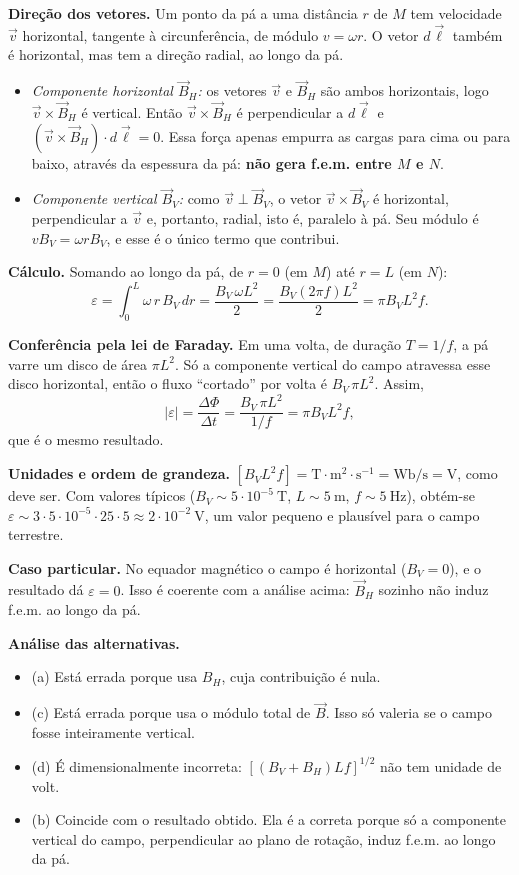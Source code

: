 \documentclass{article}%
\begin{document}
\textbf{Direção dos vetores.} Um ponto da pá a uma distância $r$ de $M$ tem velocidade $\vec v$ horizontal, tangente à circunferência, de módulo $v = \omega r$. O vetor $d\vec\ell$ também é horizontal, mas tem a direção radial, ao longo da pá.

\begin{itemize}
\item \emph{Componente horizontal $\vec B_H$:} os vetores $\vec v$ e $\vec B_H$ são ambos horizontais, logo $\vec v\times\vec B_H$ é vertical. Então $\vec v\times\vec B_H$ é perpendicular a $d\vec\ell$ e $(\vec v\times\vec B_H)\cdot d\vec\ell = 0$. Essa força apenas empurra as cargas para cima ou para baixo, através da espessura da pá: \textbf{não gera f.e.m. entre $M$ e $N$}.
\item \emph{Componente vertical $\vec B_V$:} como $\vec v \perp \vec B_V$, o vetor $\vec v\times\vec B_V$ é horizontal, perpendicular a $\vec v$ e, portanto, radial, isto é, paralelo à pá. Seu módulo é $vB_V = \omega r B_V$, e esse é o único termo que contribui.
\end{itemize}

\textbf{Cálculo.} Somando ao longo da pá, de $r=0$ (em $M$) até $r=L$ (em $N$):
\[
\varepsilon = \int_0^L \omega\, r\, B_V\, dr = \frac{B_V\,\omega L^2}{2}
= \frac{B_V (2\pi f) L^2}{2} = \pi B_V L^2 f .
\]

\textbf{Conferência pela lei de Faraday.} Em uma volta, de duração $T = 1/f$, a pá varre um disco de área $\pi L^2$. Só a componente vertical do campo atravessa esse disco horizontal, então o fluxo ``cortado'' por volta é $B_V\,\pi L^2$. Assim,
\[
|\varepsilon| = \frac{\Delta\Phi}{\Delta t} = \frac{B_V\,\pi L^2}{1/f} = \pi B_V L^2 f ,
\]
que é o mesmo resultado.

\textbf{Unidades e ordem de grandeza.} $[B_V L^2 f] = \text{T}\cdot\text{m}^2\cdot\text{s}^{-1} = \text{Wb/s} = \text{V}$, como deve ser. Com valores típicos ($B_V \sim 5\cdot 10^{-5}\ \text{T}$, $L\sim 5\ \text{m}$, $f \sim 5\ \text{Hz}$), obtém-se $\varepsilon \sim 3\cdot 5\cdot 10^{-5}\cdot 25\cdot 5 \approx 2\cdot 10^{-2}\ \text{V}$, um valor pequeno e plausível para o campo terrestre.

\textbf{Caso particular.} No equador magnético o campo é horizontal ($B_V = 0$), e o resultado dá $\varepsilon = 0$. Isso é coerente com a análise acima: $\vec B_H$ sozinho não induz f.e.m. ao longo da pá.

\textbf{Análise das alternativas.}
\begin{itemize}
\item (a) Está errada porque usa $B_H$, cuja contribuição é nula.
\item (c) Está errada porque usa o módulo total de $\vec B$. Isso só valeria se o campo fosse inteiramente vertical.
\item (d) É dimensionalmente incorreta: $[(B_V+B_H)Lf]^{1/2}$ não tem unidade de volt.
\item (b) Coincide com o resultado obtido. Ela é a correta porque só a componente vertical do campo, perpendicular ao plano de rotação, induz f.e.m. ao longo da pá.
\end{itemize}
\end{document}
